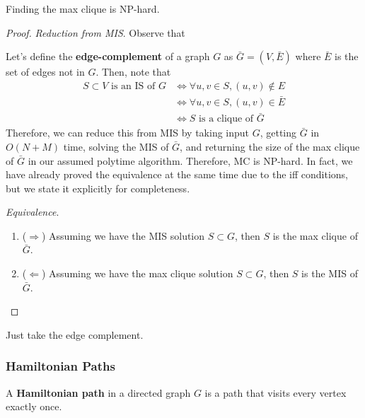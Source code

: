 \documentclass{article}
\begin{document}
      \begin{theorem}[MC]
        Finding the max clique is NP-hard. 
      \end{theorem}
      \begin{proof}
        \textit{Reduction from MIS}. Observe that 

        Let's define the \textbf{edge-complement} of a graph $G$ as $\bar{G} = (V, \bar{E})$ where $\bar{E}$ is the set of edges not in $G$. Then, note that 
        \begin{align}
          S \subset V \text{ is an IS of } G & \iff \forall u, v \in S, (u, v) \not\in E  \\
                                             & \iff \forall u, v \in S, (u, v) \in \bar{E} \\
                                             & \iff S \text{ is a clique of } \bar{G} 
        \end{align}
        Therefore, we can reduce this from MIS by taking input $G$, getting $\bar{G}$ in $O(N + M)$ time, solving the MIS of $\bar{G}$, and returning the size of the max clique of $\bar{G}$ in our assumed polytime algorithm. Therefore, MC is NP-hard. In fact, we have already proved the equivalence at the same time due to the iff conditions, but we state it explicitly for completeness. 

        \textit{Equivalence}. 
        \begin{enumerate}
          \item ($\Rightarrow$) Assuming we have the MIS solution $S \subset G$, then $S$ is the max clique of $\bar{G}$. 
          \item ($\Leftarrow$) Assuming we have the max clique solution $S \subset G$, then $S$ is the MIS of $\bar{G}$. 
        \end{enumerate}
      \end{proof}

      \begin{example}
        Just take the edge complement. 
      \end{example}

    \subsubsection{Hamiltonian Paths} 

      \begin{definition}
        A \textbf{Hamiltonian path} in a directed graph $G$ is a path that visits every vertex exactly once. 
      \end{definition} 
\end{document}
